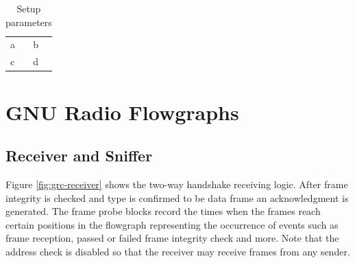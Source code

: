 \begin{table}
	\label{tab:measurement-parameters}
	\begin{center}
		\begin{tabular}{p{3.5cm}p{10cm}}
			\toprule
			a & b \\
			c & d \\
			\bottomrule	
		\end{tabular}\caption{Setup parameters}
	\end{center}
\end{table}


\section{GNU Radio Flowgraphs}

%
%

\subsection{Receiver and Sniffer}

Figure \ref{fig:grc-receiver} shows the two-way handshake receiving logic. After frame integrity is checked and type is confirmed to be data frame an acknowledgment is generated. The frame probe blocks record the times when the frames reach certain positions in the flowgraph representing the occurrence of events such as frame reception, passed or failed frame integrity check and more. Note that the address check is disabled so that the receiver may receive frames from any sender.


